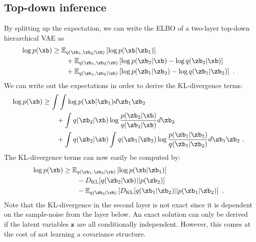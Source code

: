 {\subsection{Top-down inference}
    By splitting up the expectation, we can write the ELBO of a two-layer top-down hierarchical VAE as
    \begin{align}
        \log p(\xb) &\ge \mathbb{E}_{q(\zb_1, \zb_2|\xb)} \left[ \log p(\xb|\zb_1) \right] \\ 
        &\qquad + \mathbb{E}_{q(\zb_1,\zb_2|\xb)} \left[ \log p(\zb_2|\xb) - \log q(\zb_2|\xb) \right] \notag \\
        &\qquad + \mathbb{E}_{q(\zb_1,\zb_2|\xb)} \left[ \log p(\zb_1|\zb_2) - \log q(\zb_1|\zb_2) \right] \notag \ .
    \end{align}
    We can write out the expectations in order to derive the KL-divergence terms:
    \begin{align}
        \log p(\xb) &\ge \int \int \log p(\xb|\zb_1) d\zb_1\zb_2 \\
        &\qquad + \int q(\zb_2|\xb) \log \frac{p(\zb_2|\xb)}{q(\zb_2|\xb)} d\zb_2 \notag \\ 
        &\qquad + \int q(\zb_2|\xb) \int q(\zb_1|\zb_2) \log \frac{p(\zb_1|\zb_2)}{q(\zb_1|\zb_2)} d\zb_1\zb_2 \notag \ .
    \end{align}
    The KL-divergence terms can now easily be computed by:
    \begin{align}
        \log p(\xb) &\ge \mathbb{E}_{q(\zb_1, \zb_2|\xb)} \left[ \log p(\xb|\zb_1) \right] \\
    &\qquad - D_\text{KL}[q(\zb_2|\xb)||p(\zb_2)] \notag \\ 
    &\qquad - \mathbb{E}_{q(\zb_2|\xb)}\left[D_\text{KL}[q(\zb_1|\zb_2)||p(\zb_1|\zb_2)\right] \notag \ .
\end{align}
Note that the KL-divergence in the second layer is not exact since it is dependent on the sample-noise from the layer below. An exact solution can only be derived if the latent variables $\mathbf{z}$ are all conditionally independent. However, this comes at the cost of not learning a covariance structure.


}
